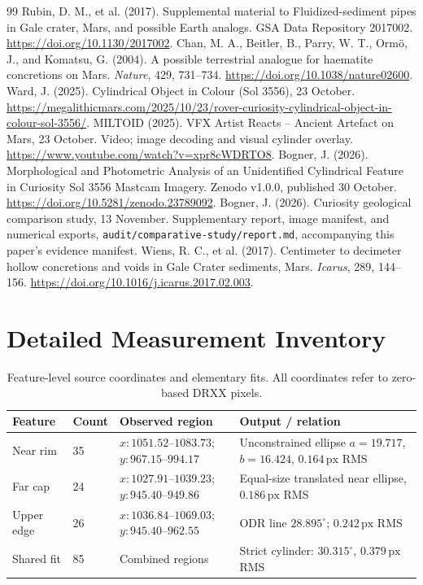 \documentclass[11pt,letterpaper]{article}
\newcommand{\px}{\,\mathrm{px}}
\newcommand{\sourcepath}[1]{\nolinkurl{#1}}
\begin{document}
\begin{thebibliography}{99}
 Rubin, D. M., et al. (2017). Supplemental material to Fluidized-sediment pipes in Gale crater, Mars, and possible Earth analogs. GSA Data Repository 2017002. \url{https://doi.org/10.1130/2017002}.
 Chan, M. A., Beitler, B., Parry, W. T., Orm\"o, J., and Komatsu, G. (2004). A possible terrestrial analogue for haematite concretions on Mars. \emph{Nature}, 429, 731--734. \url{https://doi.org/10.1038/nature02600}.
 Ward, J. (2025). Cylindrical Object in Colour (Sol 3556), 23 October. \url{https://megalithicmars.com/2025/10/23/rover-curiosity-cylindrical-object-in-colour-sol-3556/}.
 MILTOID (2025). VFX Artist Reacts -- Ancient Artefact on Mars, 23 October. Video; image decoding and visual cylinder overlay. \url{https://www.youtube.com/watch?v=xpr8cWDRTO8}.
 Bogner, J. (2026). Morphological and Photometric Analysis of an Unidentified Cylindrical Feature in Curiosity Sol 3556 Mastcam Imagery. Zenodo v1.0.0, published 30 October. \url{https://doi.org/10.5281/zenodo.23789092}.
 Bogner, J. (2026). Curiosity geological comparison study, 13 November. Supplementary report, image manifest, and numerical exports, \sourcepath{audit/comparative-study/report.md}, accompanying this paper's evidence manifest.
 Wiens, R. C., et al. (2017). Centimeter to decimeter hollow concretions and voids in Gale Crater sediments, Mars. \emph{Icarus}, 289, 144--156. \url{https://doi.org/10.1016/j.icarus.2017.02.003}.
\end{thebibliography}

\clearpage
\appendix
\section{Detailed Measurement Inventory}
\label{app:inventory}

\begin{table}[ht]
\centering\small
\caption{Feature-level source coordinates and elementary fits. All coordinates refer to zero-based DRXX pixels.}
\begin{tabularx}{\linewidth}{@{}l l l X@{}}
\toprule
\textbf{Feature} & \textbf{Count} & \textbf{Observed region} & \textbf{Output / relation} \\
\midrule
Near rim & 35 & \(x:1051.52\)--\(1083.73\); \(y:967.15\)--\(994.17\) & Unconstrained ellipse \(a=19.717\), \(b=16.424\), \(0.164\px\) RMS \\
Far cap & 24 & \(x:1027.91\)--\(1039.23\); \(y:945.40\)--\(949.86\) & Equal-size translated near ellipse, \(0.186\px\) RMS \\
Upper edge & 26 & \(x:1036.84\)--\(1069.03\); \(y:945.40\)--\(962.55\) & ODR line \(28.895^\circ\); \(0.242\px\) RMS \\
Shared fit & 85 & Combined regions & Strict cylinder: \(30.315^\circ\), \(0.379\px\) RMS \\
\bottomrule
\end{tabularx}
\end{table}
\end{document}
